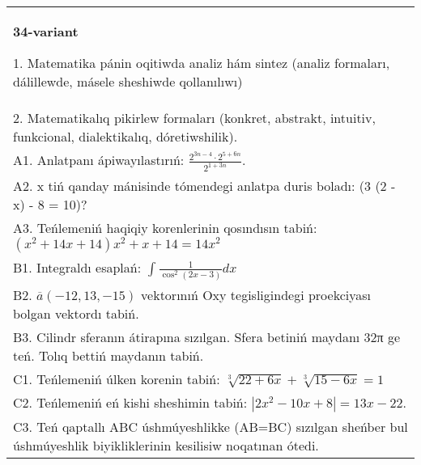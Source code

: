 \documentclass{article}
\begin{document}
\begin{tabular}{m{17cm}}
\textbf{34-variant}

1. Matematika pánin oqitiwda analiz hám sintez (analiz formaları, dálillewde, másele sheshiwde qollanılıwı) \\
2. Matematikalıq pikirlew formaları (konkret, abstrakt, intuitiv, funkcional, dialektikalıq, dóretiwshilik). \\
A1. Anlatpanı ápiwayılastırıń: \(\frac{2^{3n - 4} \cdot 2^{5 + 6n}}{2^{1 + 3n}}\). \\
A2. x tiń qanday mánisinde tómendegi anlatpa duris boladı: (3 (2 - x) - 8 = 10)? \\
A3. Teńlemeniń haqiqiy korenlerinin qosındısın tabiń: \((x^2 + 14x + 14) x^2 + x + 14 = 14x^2\) \\
B1. Integraldı esaplań: \(\int_{}^{}{\frac{1}{\cos^{2} (2x - 3) }dx}\) \\
B2. \(\overline{a} (- 12,13, - 15) \) vektorınıń Oxy tegisligindegi proekciyası bolgan vektordı tabiń. \\
B3. Cilindr sferanın átirapına sızılgan. Sfera betiniń maydanı 32π ge teń. Tolıq bettiń maydanın tabiń. \\
C1. Teńlemeniń úlken korenin tabiń: \(\sqrt[3]{22 + 6x} + \sqrt[3]{15 - 6x} = 1\) \\
C2. Teńlemeniń eń kishi sheshimin tabiń: \(\left| 2x^2 - 10x + 8 \right| = 13x - 22\). \\
C3. Teń qaptallı ABC úshmúyeshlikke (AB=BC) sızılgan sheńber bul úshmúyeshlik biyikliklerinin kesilisiw noqatınan ótedi. \\

\end{tabular}
\vspace{1cm}
\end{document}

